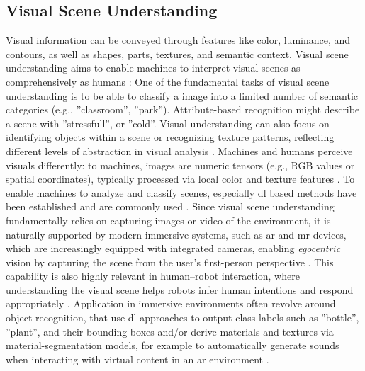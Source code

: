 \subsection{Visual Scene Understanding}
\label{sec:visual_scene_understanding}
Visual information can be conveyed through features like color, luminance, and contours, as well as shapes, parts, textures, and semantic context. Visual scene understanding aims to enable machines to interpret visual scenes as comprehensively as humans \cite{Aarthi_17_SceneUnderstandingDef}: One of the fundamental tasks of visual scene understanding is to be able to classify a image into a limited number of semantic categories (e.g., ''classroom'', ''park''). Attribute-based recognition might describe a scene with ''stressfull'', or ''cold''. Visual understanding can also focus on identifying objects within a scene or recognizing texture patterns, reflecting different levels of abstraction in visual analysis \cite{Zeng_21_SceneUnderstandingDeepLearning}.
Machines and humans perceive visuals differently: to machines, images are numeric tensors (e.g., RGB values or spatial coordinates), typically processed via local color and texture features \cite{Naseer_19_IndoorSceneUnderstanding}.
To enable machines to analyze and classify scenes, especially \gls{dl} based methods have been established and are commonly used \cite{Zeng_21_SceneUnderstandingDeepLearning}.
Since visual scene understanding fundamentally relies on capturing images or video of the environment, it is naturally supported by modern immersive systems, such as \gls{ar} and \gls{mr} devices, which are increasingly equipped with integrated cameras, enabling \textit{egocentric} vision by capturing the scene from the user’s first-person perspective \cite{Li_26_EgocentricVision}.
This capability is also highly relevant in human–robot interaction, where understanding the visual scene helps robots infer human intentions and respond appropriately \cite{Shen_26_VisualAndSpeechRobot, Han_25_PhysicalAIObjects}.
Application in immersive environments often revolve around object recognition, that use \gls{dl} approaches to output class labels such as ''bottle'', ''plant'', and their bounding boxes \cite{Dogan_24_ObjectIntelligenceInXR, Li_24_SituationAdaptLLMReasoning, Chang_24_WorldScribeLiveVisualDescriptions} and/or derive materials and textures via material-segmentation models, for example to automatically generate sounds when interacting with virtual content in an \gls{ar} environment \cite{Su_24_SonifyAR, Schütz_25_SonifyAnything}.\\
